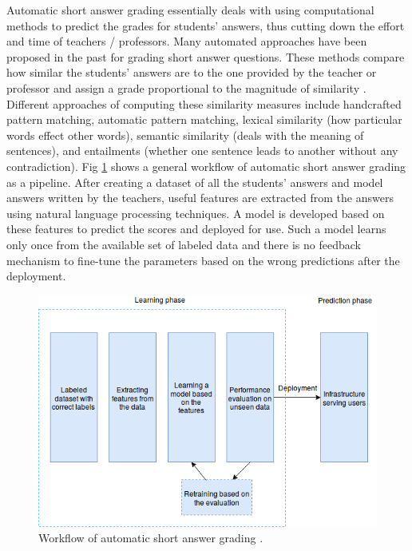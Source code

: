 \documentclass[rnd]{mas_proposal}
\begin{document}
Automatic short answer grading essentially deals with using computational methods to predict the grades for students' answers, thus cutting down the effort and time of teachers / professors. Many automated approaches have been proposed in the past for grading short answer questions. These methods compare how similar the students' answers are to the one provided by the teacher or professor and assign a grade proportional to the magnitude of similarity \cite{Mohler2011}. Different approaches of computing these similarity measures include handcrafted pattern matching, automatic pattern matching, lexical similarity (how particular words effect other words), semantic similarity (deals with the meaning of sentences), and entailments (whether one sentence leads to another without any contradiction). Fig \ref{auto_workflow} shows a general workflow of automatic short answer grading as a pipeline. After creating a dataset of all the students' answers and model answers written by the teachers, useful features are extracted from the answers using natural language processing techniques. A model is developed based on these features to predict the scores and deployed for use. Such a model learns only once from the available set of labeled data and there is no feedback mechanism to fine-tune the parameters based on the wrong predictions after the deployment.

\vspace{3mm}
\begin{figure}[h!]
	\centering
	\includegraphics[scale=0.6]{images/simpler_model_1}
	\caption{Workflow of automatic short answer grading \cite{Burrows2015}.}
	\label{auto_workflow}
\end{figure}
\end{document}
